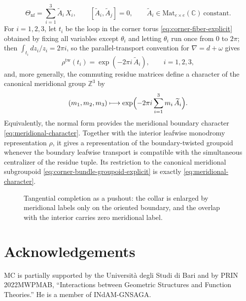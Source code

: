 \documentclass[11pt]{amsart}
\theoremstyle{plain}
\theoremstyle{definition}
\newcommand{\Mon}{\mathrm{Mon}}
\theoremstyle{definition}
\begin{document}
\begin{equation}\label{eq:normal-form}
\Theta_{\mathrm{nf}}=\sum_{i=1}^3 \widetilde A_i\,X_i,
\qquad
[\widetilde A_i,\widetilde A_j]=0,
\qquad
\widetilde A_i\in\mathrm{Mat}_{e\times e}(\mathbb{C})\ \text{constant}.
\end{equation}
For $i=1,2,3$, let $t_i$ be the loop in the corner torus \eqref{eq:corner-fiber-explicit} obtained by fixing all variables except $\theta_i$ and letting $\theta_i$ run once from $0$ to $2\pi$; then $\int_{t_i} dz_i/z_i=2\pi i$, so the parallel-transport convention for $\nabla=d+\omega$ gives
\begin{equation}\label{eq:holonomy-meridian}
\rho^{\mathrm{tw}}(t_i)=\exp(-2\pi i\,\widetilde A_i),\qquad i=1,2,3,
\end{equation}
and, more generally, the commuting residue matrices define a character of the canonical meridional group $\mathbb{Z}^3$ by
\begin{equation}\label{eq:meridional-character}
(m_1,m_2,m_3)\longmapsto
\exp\Bigl(-2\pi i\sum_{i=1}^3 m_i\,\widetilde A_i\Bigr).
\end{equation}
Equivalently, the normal form provides the meridional boundary character \eqref{eq:meridional-character}. Together with the interior leafwise monodromy representation $\rho$, it gives a representation of the boundary-twisted groupoid whenever the boundary leafwise transport is compatible with the simultaneous centralizer of the residue tuple. Its restriction to the canonical meridional subgroupoid \eqref{eq:corner-bundle-groupoid-explicit} is exactly \eqref{eq:meridional-character}.

\begin{figure}[t]
\centering
{}
\caption{Tangential completion as a pushout: the collar is enlarged by meridional labels only on the oriented boundary, and the overlap with the interior carries zero meridional label.}
\label{fig:pushout-diagram}
\end{figure}


 
\section*{Acknowledgements}
MC is partially supported by the Universit\`a degli Studi di Bari and by PRIN 2022MWPMAB, ``Interactions between Geometric Structures and Function Theories.'' He is a member of INdAM-GNSAGA.
\end{document}
